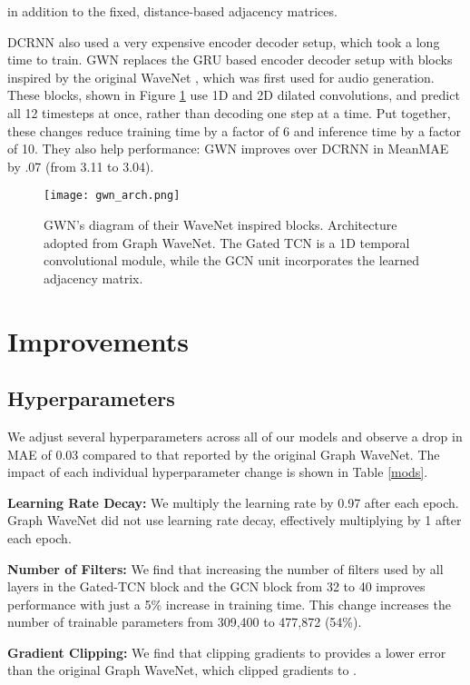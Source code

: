 \documentclass[10pt]{article}
\begin{document}
\newline in addition to the fixed, distance-based adjacency matrices.

DCRNN also used a very expensive encoder decoder setup, which took a long time to train. GWN replaces the GRU based encoder decoder setup with blocks inspired by the original WaveNet \citep{WaveNet}, which was first used for audio generation. These blocks, shown in Figure \ref{gwn_architecture} use 1D and 2D dilated convolutions, and predict all 12 timesteps at once, rather than decoding one step at a time. Put together, these changes reduce training time by a factor of 6 and inference time by a factor of 10. They also help performance: GWN improves over DCRNN in MeanMAE by .07 (from 3.11 to 3.04).

\begin{figure}[H]
\centering
    \texttt{[image: gwn\_arch.png]}
    \caption{GWN's diagram of their WaveNet inspired blocks. Architecture adopted from Graph WaveNet. The Gated TCN is a 1D temporal convolutional module, while the GCN unit incorporates the learned adjacency matrix.
    }
    \label{gwn_architecture}
\end{figure}

\section{Improvements}

\subsection{Hyperparameters}

We adjust several hyperparameters across all of our models and observe a drop in MAE of 0.03 compared to that reported by the original Graph WaveNet. The impact of each individual hyperparameter change is shown in Table \ref{mods}.

\textbf{Learning Rate Decay:} We multiply the learning rate by 0.97 after each epoch. Graph WaveNet did not use learning rate decay, effectively multiplying by 1 after each epoch.

\textbf{Number of Filters:} We find that increasing the number of filters used by all layers in the Gated-TCN block and the GCN block from 32 to 40 improves performance with just a 5\% increase in training time. This change increases the number of trainable parameters from 309,400 to 477,872 (54\%).

\textbf{Gradient Clipping:} We find that clipping gradients to  provides a lower error than the original Graph WaveNet, which clipped gradients to . 
\end{document}
